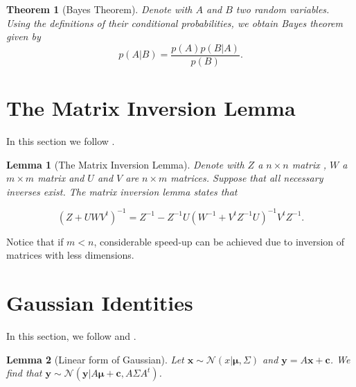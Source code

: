 \documentclass[12pt,a4paper,oneside]{book}
\newtheorem{Lemma}{Lemma}
\newtheorem{Theorem}{Theorem}
\begin{document}
\begin{Theorem}[Bayes Theorem]
Denote with $A$ and $B$ two random variables. Using the definitions of their conditional probabilities, we obtain Bayes theorem given by
\begin{equation}\label{BayesTheorem}
p(A|B) = \dfrac{p(A)p(B|A)}{p(B)}.
\end{equation}
\end{Theorem}

\section{The Matrix Inversion Lemma}\label{InversionLemma}

In this section we follow \cite{GPRbook}. 

\begin{Lemma}[The Matrix Inversion Lemma]
Denote with $Z$ a $n \times n$ matrix , $W$ a $m \times m$ matrix and $U$ and $V$ are $n \times m$ matrices. Suppose that all necessary inverses exist. The matrix inversion lemma states that 

\begin{equation}
(Z + UWV^t)^{-1} = Z^{-1} - Z^{-1}U(W^{-1} + V^tZ^{-1}U)^{-1} V^tZ^{-1}.
\end{equation}
\end{Lemma}


Notice that if $m <n$, considerable speed-up can be achieved due to inversion of matrices with less dimensions.

\section{Gaussian Identities}\label{Conditioning_of_Gaussians}

In this section, we follow \cite{GPRbook} and \cite{Kuss:06}.

\begin{Lemma} [Linear form of Gaussian] \label{appendix_linearform}
Let $\bm{x} \sim \mathcal{N}(x|\bm{\mu}, \Sigma)$ and $\bm{y} = A \bm{x} + \bm{c}$. We find that $\bm{y} \sim \mathcal{N} (\bm{y}| A \bm{\mu} + \bm{c},  A \Sigma A^t)$.
\end{Lemma}
\end{document}
